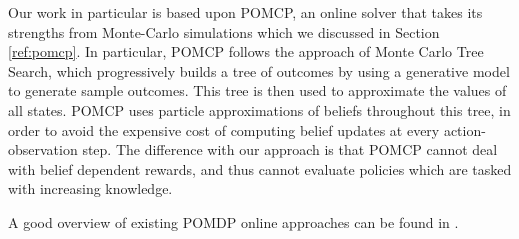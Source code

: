 %

Our work in particular is based upon POMCP, an online solver that takes its strengths from
Monte-Carlo simulations \cite{cit:pomcp} which we discussed in Section \ref{ref:pomcp}. In
particular, POMCP follows the approach of Monte Carlo Tree Search, which progressively builds a tree
of outcomes by using a generative model to generate sample outcomes. This tree is then used to
approximate the values of all states. POMCP uses particle approximations of beliefs throughout this
tree, in order to avoid the expensive cost of computing belief updates at every action-observation
step. The difference with our approach is that POMCP cannot deal with belief dependent rewards, and
thus cannot evaluate policies which are tasked with increasing knowledge.

A good overview of existing POMDP online approaches can be found in \cite{cit:relworkonlineall}.
